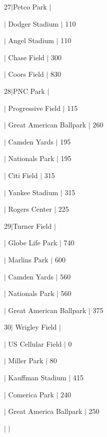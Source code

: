 27$\vert$\+Petco Park $\vert$
\begin{DoxyItemize}
\item $\vert$ Dodger Stadium $\vert$ 110
\item $\vert$ Angel Stadium $\vert$ 110
\item $\vert$ Chase Field $\vert$ 300
\item $\vert$ Coors Field $\vert$ 830
\end{DoxyItemize}

28$\vert$\+P\+NC Park $\vert$
\begin{DoxyItemize}
\item $\vert$ Progressive Field $\vert$ 115
\item $\vert$ Great American Ballpark $\vert$ 260
\item $\vert$ Camden Yards $\vert$ 195
\item $\vert$ Nationals Park $\vert$ 195
\item $\vert$ Citi Field $\vert$ 315
\item $\vert$ Yankee Stadium $\vert$ 315
\item $\vert$ Rogers Center $\vert$ 225
\end{DoxyItemize}

29$\vert$\+Turner Field $\vert$
\begin{DoxyItemize}
\item $\vert$ Globe Life Park $\vert$ 740
\item $\vert$ Marlins Park $\vert$ 600
\item $\vert$ Camden Yards $\vert$ 560
\item $\vert$ Nationals Park $\vert$ 560
\item $\vert$ Great American Ballpark $\vert$ 375
\end{DoxyItemize}

30$\vert$ Wrigley Field $\vert$
\begin{DoxyItemize}
\item $\vert$ US Cellular Field $\vert$ 0
\item $\vert$ Miller Park $\vert$ 80
\item $\vert$ Kauffman Stadium $\vert$ 415
\item $\vert$ Comerica Park $\vert$ 240
\item $\vert$ Great America Ballpark $\vert$ 250
\item $\vert$ $\vert$ 
\end{DoxyItemize}
